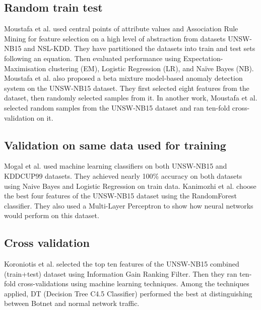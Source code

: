 \documentclass[14pt, conference]{IEEEtran}
\begin{document}
\subsection{Random train test}
Moustafa et al. \cite{moustafa2017hybrid} used central points of attribute values and Association Rule Mining for feature
selection on a high level of abstraction from datasets UNSW-NB15 and NSL-KDD. They have partitioned the datasets into train and test sets following an equation. Then evaluated performance using Expectation-Maximisation clustering (EM), Logistic Regression (LR), and Naïve Bayes (NB). 
Moustafa et al. \cite{moustafa2018anomaly} also proposed a beta mixture model-based anomaly detection system on the UNSW-NB15 dataset. They first selected eight features from the dataset,
then randomly selected samples from it. 
In another work, Moustafa et al. \cite{moustafa2019holistic} selected random samples from the UNSW-NB15 dataset and ran ten-fold cross-validation on it. %

\subsection{Validation on same data used for training}
Mogal et al.\cite{mogal2017nids} used machine learning classifiers on both UNSW-NB15 and KDDCUP99 datasets.
They achieved nearly 100\% accuracy on both datasets using Naive Bayes and Logistic Regression on train data. Kanimozhi et al. \cite{Kanimozhi2019UNSW-NB15} choose the best four features of
the UNSW-NB15 dataset using the RandomForest classifier. They also used a Multi-Layer Perceptron to show how neural
networks would perform on this dataset. 

\subsection{Cross validation}
Koroniotis et al.\cite{koroniotis2017towards} selected the top ten features of the UNSW-NB15 combined (train+test)
dataset using Information Gain Ranking Filter. Then they ran ten-fold cross-validations using machine learning techniques.
Among the techniques applied, DT (Decision Tree C4.5 Classifier) performed the best at distinguishing between Botnet and normal network traffic.
 
\end{document}
